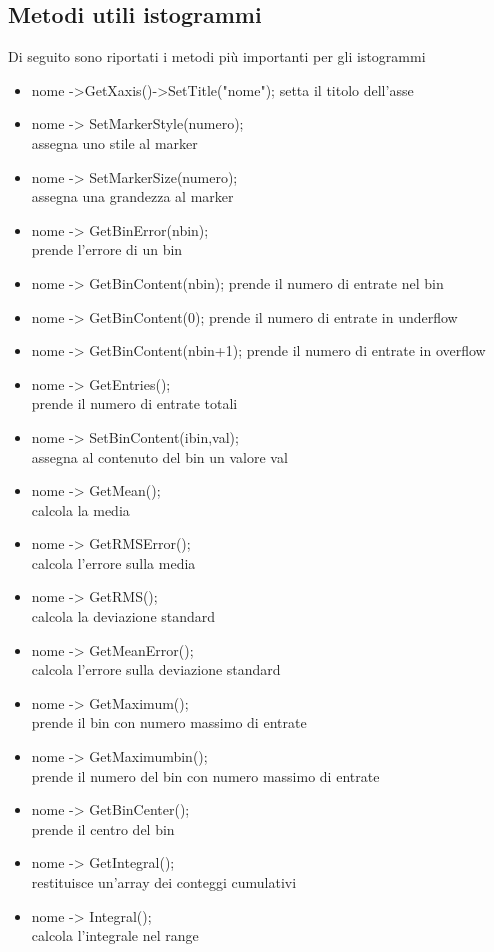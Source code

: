 \documentclass[10pt,a4paper]{article}
\begin{document}
\subsection{Metodi utili istogrammi}
Di seguito sono riportati i metodi più importanti per gli istogrammi
\begin{itemize}
	\item nome ->GetXaxis()->SetTitle("nome");
	setta il titolo dell'asse
	\item nome -> SetMarkerStyle(numero);\\
	assegna uno stile al marker
	\item nome -> SetMarkerSize(numero);\\
	assegna una grandezza al marker
	\item nome -> GetBinError(nbin);\\
	prende l'errore di un bin
	\item nome -> GetBinContent(nbin);
	prende il numero di entrate nel bin
	\item nome -> GetBinContent(0);
	prende il numero di entrate in underflow
	\item nome -> GetBinContent(nbin+1);
	prende il numero di entrate in overflow
	\item nome -> GetEntries();\\
	prende il numero di entrate totali
	\item nome -> SetBinContent(ibin,val);\\
	assegna al contenuto del bin un valore val
	\item nome -> GetMean();\\
	calcola la media
	\item nome -> GetRMSError();\\
	calcola l'errore sulla media
	\item nome -> GetRMS();\\
	calcola la deviazione standard
	\item nome -> GetMeanError();\\
	calcola l'errore sulla deviazione standard
	\item nome -> GetMaximum();\\
	prende il bin con numero massimo di entrate
	\item nome -> GetMaximumbin();\\
	prende il numero del bin con numero massimo di entrate
	\item nome -> GetBinCenter();\\
	prende il centro del bin
	\item nome -> GetIntegral();\\
	restituisce un'array dei conteggi cumulativi 
	\item nome -> Integral();\\
	calcola l'integrale nel range
\end{itemize}
\end{document}
